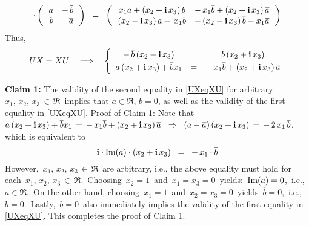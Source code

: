 \begin{enumerate}
\begin{eqnarray*}
		\cdot
		\left(\,\begin{array}{rr}
			a & -\,\overline{b}
			\\
			b & \overline{a}
			\end{array}\,\right)
	\;\; = \;\;
		\left(\,\begin{array}{cc}
			x_{1}a + (x_{2}+\textnormal{\bf i}\,x_{3})\,b &  -\,x_{1}\overline{b} + (x_{2}+\textnormal{\bf i}\,x_{3})\,\overline{a}
			\\
			(x_{2}-\textnormal{\bf i}\,x_{3})\,a - \,x_{1}b & -\,(x_{2}-\textnormal{\bf i}\,x_{3})\,\overline{b} - x_{1}\overline{a}
			\end{array}\,\right)
	\end{eqnarray*}
	Thus,
	\begin{equation}\label{UXeqXU}
	UX = XU
	\quad\Longrightarrow\quad
	\left\{\begin{array}{ccc}
		-\,\overline{b}\,(x_{2} - \i\,x_{3}) & = & b\,(x_{2} + \i\,x_{3})
		\\
		a\,(x_{2} + \i\,x_{3}) + \overline{b}x_{1} & \overset{{\color{white}1}}{=} & -\,x_{1}\overline{b} + (x_{2} + \i\,x_{3})\,\overline{a}
		\end{array}\right.
	\end{equation}

	\vskip 0.3cm
	\noindent
	\textbf{Claim 1:}\quad
	The validity of the second equality in \eqref{UXeqXU} for arbitrary 
	\,$x_{1},\, x_{2},\, x_{3} \,\in\, \Re$\,
	 implies that
	$a \in \Re$, $b = 0$, as well as the validity of the first equality in \eqref{UXeqXU}.
	\vskip 0.1cm
	\noindent
	Proof of Claim 1:\quad
	Note that
	\,$a\,(x_{2} + \textnormal{\bf i}\,x_{3}) + \overline{b}x_{1}  \, = \, -\,x_{1}\overline{b} + (x_{2} + \textnormal{\bf i}\,x_{3})\,\overline{a}$\,
	\;\;$\Longrightarrow$\;\;
	\,$(a - \overline{a}) \, (x_{2} + \textnormal{\bf i}\,x_{3}) \, = \, - \, 2 \, x_{1}\,\overline{b}$,\,
	which is equivalent to
	\begin{equation*}
	\textnormal{\bf i} \cdot \textnormal{Im}(a) \cdot (x_{2} + \textnormal{\bf i}\,x_{3}) \;\; = \;\; - \, x_{1} \cdot \overline{b} 
	\end{equation*}
	However, \,$x_{1},\, x_{2},\, x_{3} \,\in\, \Re$\, are arbitrary, i.e.,
	the above equality must hold for each \,$x_{1},\, x_{2},\, x_{3} \,\in\, \Re$.\,
	Choosing \,$x_{2} = 1$\, and \,$x_{1} = x_{3} = 0$\, yields:
	\,$\textnormal{Im}(a) = 0$,\, i.e., \,$a \in \Re$.\,
	On the other hand, choosing \,$x_{1} = 1$\, and \,$x_{2} = x_{3} = 0$\,
	yields
	\,$\overline{b} = 0$,\, i.e., \,$b = 0$.\,
	Lastly, \,$b = 0$\, also immediately implies the validity of the first equality in \eqref{UXeqXU}.
	This completes the proof of Claim 1.
	

\end{enumerate}
